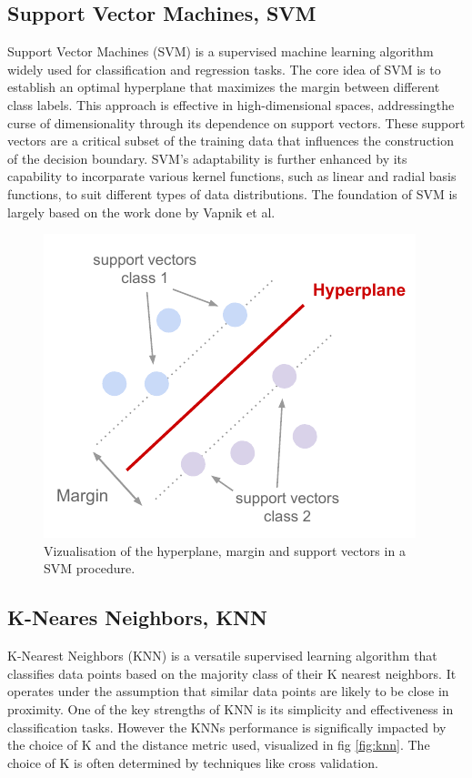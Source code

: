 \subsection{Support Vector Machines, SVM}
Support Vector Machines (SVM) is a supervised machine learning algorithm widely used for classification and regression tasks. The core idea of SVM is to establish an optimal hyperplane that maximizes the margin between different class labels. This approach is effective in high-dimensional spaces, addressingthe curse of dimensionality through its dependence on support vectors.
These support vectors are a critical subset of the training data that influences the construction of the decision boundary. SVM's adaptability is further enhanced by its capability to incorparate various kernel functions, such as linear and radial basis functions, to suit different types
of data distributions. The foundation of SVM is largely based on the work done by Vapnik et al\cite{svm}.
\begin{figure}[H]
    \includegraphics[scale=0.8]{figures/figure-pdf/SVM.pdf}
    \caption{Vizualisation of the hyperplane, margin and support vectors in a SVM procedure.}
\end{figure}


\subsection{K-Neares Neighbors, KNN}
K-Nearest Neighbors (KNN) is a versatile supervised learning algorithm that classifies data points based on the majority class of their K nearest neighbors.
It operates under the assumption that similar data points are likely to be close in proximity. One of the key strengths of KNN is its simplicity and effectiveness in classification tasks. 
However the KNNs performance is significally impacted by the choice of K and the distance metric used, visualized in fig \ref{fig:knn}.
The choice of K is often determined by techniques like cross validation.

